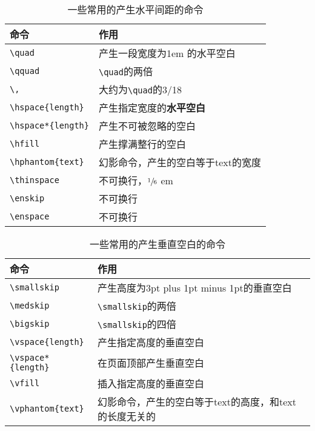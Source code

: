 \begin{longtable}{ll}
        \caption{一些常用的产生水平间距的命令}\\
        \toprule
        命令 & 作用\\
        \midrule
        \verb|\quad| & 产生一段宽度为1em 的水平空白\\
        \verb|\qquad| & \verb|\quad|的两倍\\
        \verb|\,| & 大约为\verb|\quad|的3/18\\
        \verb|\hspace{length}| & 产生指定宽度的\textbf{水平空白}\\
        \verb|\hspace*{length}| & 产生不可被忽略的空白\\
        \verb|\hfill| & 产生撑满整行的空白\\
        \verb|\hphantom{text}| & 幻影命令，产生的空白等于text的宽度\\
        \verb|\thinspace| & 不可换行，$ \sfrac{1}{6} $ em\\
        \verb|\enskip| & 不可换行\\
        \verb|\enspace| & 不可换行\\
        \bottomrule
\end{longtable}


\begin{longtable}{ll}
    \caption{一些常用的产生垂直空白的命令}\\
    \toprule
    命令 & 作用\\
    \midrule
    \verb|\smallskip| & 产生高度为3pt plus 1pt minus 1pt的垂直空白\\
    \verb|\medskip| & \verb|\smallskip|的两倍\\
    \verb|\bigskip| & \verb|\smallskip|的四倍\\
    \verb|\vspace{length}| & 产生指定高度的垂直空白\\
    \verb|\vspace*{length}| & 在页面顶部产生垂直空白\\
    \verb|\vfill| & 插入指定高度的垂直空白\\
    \verb|\vphantom{text}| & 幻影命令，产生的空白等于text的高度，和text的长度无关的\\
    \bottomrule
\end{longtable}


